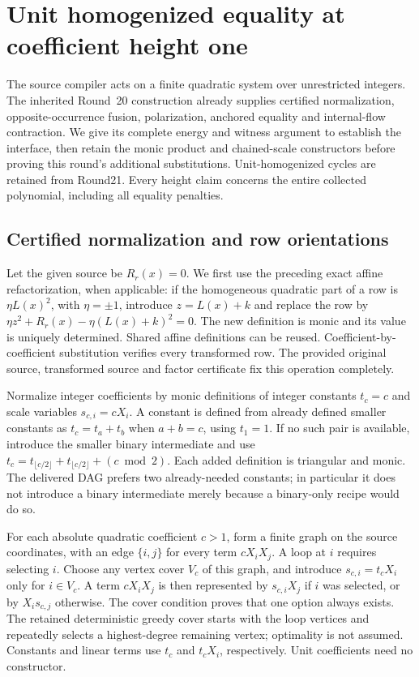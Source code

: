 \section{Unit homogenized equality at coefficient height one}
\label{sec:signed-network}
The source compiler acts on a finite quadratic system over unrestricted
integers. The inherited Round~20 construction already supplies certified
normalization, opposite-occurrence fusion, polarization, anchored equality
and internal-flow contraction. We give its complete energy and witness
argument to establish the interface, then retain the monic product and chained-scale
constructors before proving this round's additional substitutions. Unit-homogenized cycles are retained from Round21. Every height claim concerns the entire collected
polynomial, including all equality penalties.

\subsection{Certified normalization and row orientations}
Let the given source be $R_r(x)=0$. We first use the preceding exact affine
refactorization, when applicable: if the homogeneous quadratic part of a
row is $\eta L(x)^2$, with $\eta=\pm1$, introduce $z=L(x)+k$ and replace
the row by $\eta z^2+R_r(x)-\eta(L(x)+k)^2=0$. The new definition is monic
and its value is uniquely determined. Shared affine definitions can be
reused. Coefficient-by-coefficient substitution verifies every transformed
row. The provided original source, transformed source and factor
certificate fix this operation completely.

Normalize integer coefficients by monic definitions of integer constants
$t_c=c$ and scale variables $s_{c,i}=cX_i$. A constant is defined from
already defined smaller constants as $t_c=t_a+t_b$ when $a+b=c$, using
$t_1=1$. If no such pair is available, introduce the smaller binary
intermediate and use
$t_c=t_{\lfloor c/2\rfloor}+t_{\lfloor c/2\rfloor}+(c\bmod2)$.
Each added definition is triangular and monic. The delivered DAG prefers
two already-needed constants; in particular it does not introduce a
binary intermediate merely because a binary-only recipe would do so.

For each absolute quadratic coefficient $c>1$, form a finite graph on the
source coordinates, with an edge $\{i,j\}$ for every term $cX_iX_j$.
A loop at $i$ requires selecting $i$. Choose any vertex cover $V_c$ of
this graph, and introduce $s_{c,i}=t_cX_i$ only for $i\in V_c$. A term
$cX_iX_j$ is then represented by $s_{c,i}X_j$ if $i$ was selected, or by
$X_is_{c,j}$ otherwise. The cover condition proves that one option always
exists. The retained deterministic greedy cover starts with the loop
vertices and repeatedly selects a highest-degree remaining vertex;
optimality is not assumed. Constants and linear terms use $t_c$ and
$t_cX_i$, respectively. Unit coefficients need no constructor.


